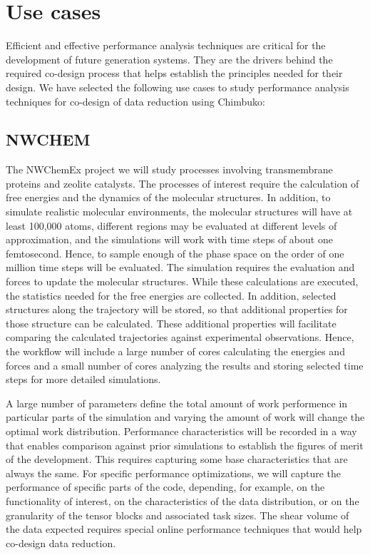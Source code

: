 \section{Use cases}
Efficient and effective performance analysis techniques are critical for the development of future generation systems. They are the drivers behind the required co-design process that helps establish the principles needed for their design. We have selected the following use cases to study performance analysis techniques for co-design of data reduction using Chimbuko:

\subsection{NWCHEM}
The NWChemEx project we will study processes involving transmembrane proteins and zeolite catalysts. The processes of interest require the calculation of free energies and the dynamics of the molecular structures. In addition, to simulate realistic molecular environments, the molecular structures will have at least 100,000 atoms, different regions may be evaluated at different levels of approximation, and the simulations will work with time steps of about one femtosecond.  Hence, to sample enough of the phase space on the order of one million time steps will be evaluated. The simulation requires the evaluation and forces to update the molecular structures. While these calculations are executed, the statistics needed for the free energies are collected. In addition, selected structures along the trajectory will be stored, so that additional properties for those structure can be calculated. These additional properties will facilitate comparing the calculated trajectories against experimental observations.  Hence, the workflow will include a large number of cores calculating the energies and forces and a small number of cores analyzing the results and storing selected time steps for more detailed simulations. 

A large number of parameters define the total amount of work performence in particular parts of the simulation and varying the amount of work will change the optimal work distribution. Performance characteristics will be recorded in a way that enables comparison against prior simulations to establish the figures of merit of the development. This requires capturing some base characteristics that are always the same. 
For specific performance optimizations, we will capture the performance of specific parts of the code, depending, for example, on the functionality of interest, on the characteristics of the data distribution, or on the granularity of the tensor blocks and associated task sizes. 
The shear volume of the data expected requires special online performance techniques that would help co-design data reduction.

